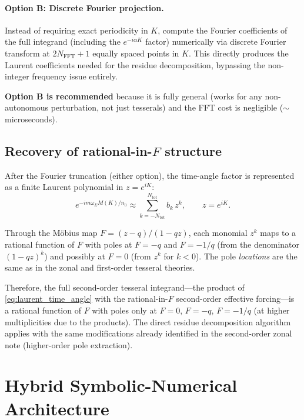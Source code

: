 \documentclass[11pt]{article}
\begin{document}
\paragraph{Option B: Discrete Fourier projection.}
Instead of requiring exact periodicity in $K$, compute the Fourier
coefficients of the full integrand (including the $e^{-i\alpha K}$ factor)
numerically via discrete Fourier transform at $2N_{\mathrm{FFT}} + 1$
equally spaced points in $K$. This directly produces the Laurent
coefficients needed for the residue decomposition, bypassing the
non-integer frequency issue entirely.

\textbf{Option B is recommended} because it is fully general (works for
any non-autonomous perturbation, not just tesserals) and the FFT cost is
negligible ($\sim$microseconds).

\subsection{Recovery of rational-in-\texorpdfstring{$F$}{F} structure}

After the Fourier truncation (either option), the time-angle factor is
represented as a finite Laurent polynomial in $z = e^{iK}$:
\begin{equation}
e^{-im\omega_E M(K)/n_0}
\approx \sum_{k=-N_{\mathrm{tot}}}^{N_{\mathrm{tot}}}
b_k\, z^k,
\qquad
z = e^{iK}.
\label{eq:laurent_time_angle}
\end{equation}

Through the M\"obius map $F = (z - q)/(1 - qz)$, each monomial $z^k$ maps
to a rational function of $F$ with poles at $F = -q$ and $F = -1/q$
(from the denominator $(1-qz)^k$) and possibly at $F = 0$ (from
$z^k$ for $k < 0$). The pole \emph{locations} are the same as in the
zonal and first-order tesseral theories.

Therefore, the full second-order tesseral integrand---the product of
\eqref{eq:laurent_time_angle} with the rational-in-$F$ second-order
effective forcing---is a rational function of $F$ with poles only at
$F = 0$, $F = -q$, $F = -1/q$ (at higher multiplicities due to the
products). The direct residue decomposition algorithm applies
with the same modifications already identified in the second-order zonal
note (higher-order pole extraction).


\section{Hybrid Symbolic-Numerical Architecture}
\label{sec:architecture}
\end{document}
